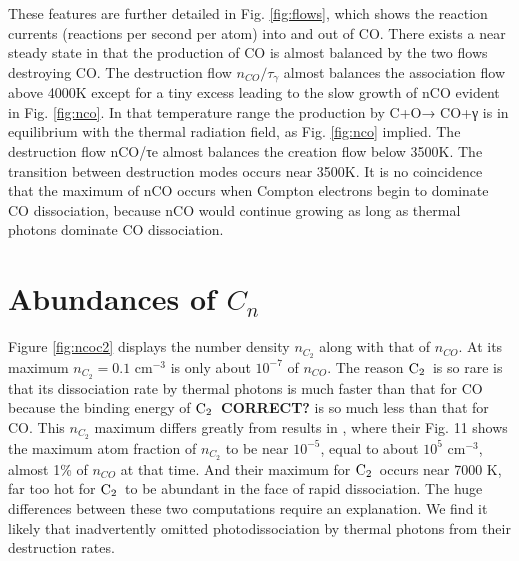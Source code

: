\documentclass[manuscript]{aastex}
\newcommand{\ctwo}{${\rm C}_2$}
\begin{document}
These features are further detailed in Fig. \ref{fig:flows},
which shows the reaction
currents (reactions per second per atom) into and out of CO. There exists a
near steady state in that the production of CO is almost balanced by the
two flows destroying CO. The destruction flow $n_{CO}/\tau_\gamma$
almost balances the
association flow above 4000K except for a tiny excess leading to the
slow growth of nCO evident in Fig. \ref{fig:nco}. In that temperature range the
production by C+O→ CO+γ is in equilibrium with the thermal radiation field,
as Fig. \ref{fig:nco} implied. The destruction flow nCO/τe almost balances the
creation flow below 3500K. The transition between destruction modes occurs
near 3500K. It is no coincidence that the maximum of nCO occurs when
Compton electrons begin to dominate CO dissociation, because nCO would
continue growing as long as thermal photons dominate CO dissociation. 

\section{Abundances of $C_n$}

Figure \ref{fig:ncoc2} displays the number density $n_{C_2}$ along with
that of $n_{CO}$. At its maximum $n_{C_2} =0.1$ cm$^{-3}$ is only about
$10^{-7}$ of $n_{CO}$. The reason \ctwo\ is so rare is that its dissociation
rate by thermal photons is much faster than that for CO because the binding
energy of {\bf \ctwo\ CORRECT?} is
so much less than that for CO. This $n_{C_2}$
maximum differs greatly
from results in \citet{2009ApJ...703..642C}, where their Fig. 11 shows the
maximum atom fraction of $n_{C_2}$ to be near $10^{-5}$,
equal to about $10^5$ cm$^{-3}$, almost 1\% of $n_{CO}$ at that time.
And their maximum for \ctwo\ occurs near 7000 K, far too hot for \ctwo\ to
be abundant in the face of rapid dissociation. The huge differences between
these two computations require an explanation. We find it likely that
\cite{2009ApJ...703..642C} inadvertently omitted photodissociation by thermal
photons from their destruction rates.  
\end{document}
